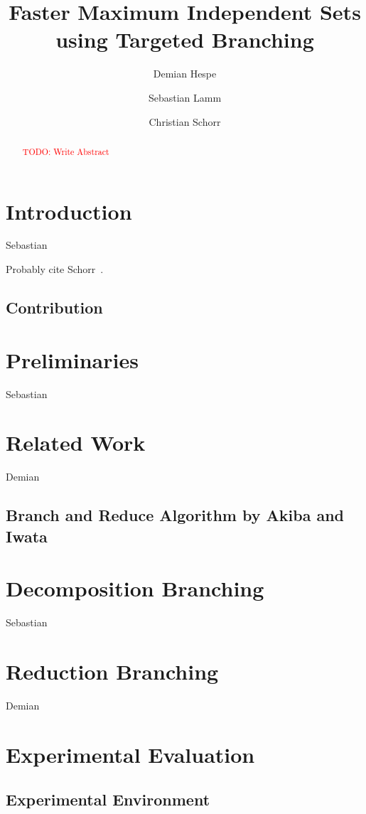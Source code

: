 \documentclass[a4paper,UKenglish,cleveref, autoref, thm-restate]{lipics-v2021}
\title{Faster Maximum Independent Sets using Targeted Branching} %
\author{Demian Hespe}{Karlsruhe Institute of Technology, Institute for
  Theoretical Informatics, Germany}{hespe@kit.edu}{}{}
\author{Sebastian Lamm}{Karlsruhe Institute of Technology, Institute for
  Theoretical Informatics, Germany}{lamm@kit.edu}{}{\textcolor{red} {TODO: Add funding}}
\author{Christian Schorr}{Karlsruhe Institute of Technology, Institute for
  Theoretical Informatics, Germany}{uztfp@student.kit.edu}{}{}
\begin{document}
\maketitle

\begin{abstract}
  \textcolor{red}{TODO: Write Abstract}
\end{abstract}

\newpage

\section{Introduction}
Sebastian

Probably cite Schorr~\cite{schorr2020improved}.

\subsection{Contribution}

\section{Preliminaries}
Sebastian

\section{Related Work}
Demian

\subsection{Branch and Reduce Algorithm by Akiba and Iwata~\cite{DBLP:journals/tcs/AkibaI16}}

\section{Decomposition Branching}
Sebastian

\section{Reduction Branching}
Demian

\section{Experimental Evaluation}

\subsection{Experimental Environment}
\end{document}
